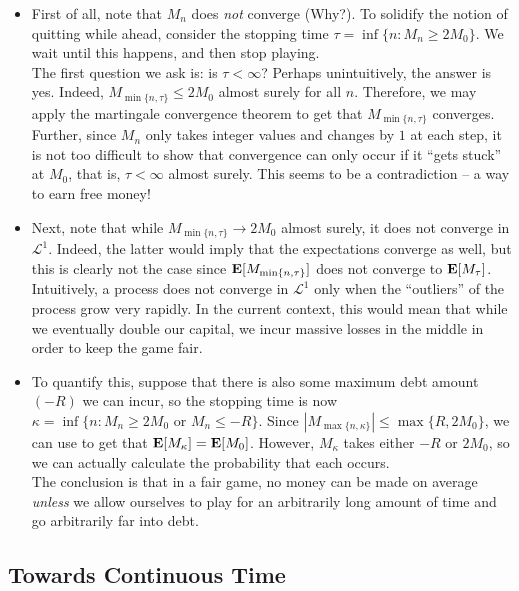 \begin{itemize}
	\item First of all, note that $M_n$ does \textit{not} converge (Why?). To solidify the notion of quitting while ahead, consider the stopping time $\tau = \inf\{n : M_n\geq 2M_0\}$. We wait until this happens, and then stop playing.\\
	The first question we ask is: is $\tau<\infty$? Perhaps unintuitively, the answer is yes. Indeed, $M_{\min\{n,\tau\}} \leq 2M_0$ almost surely for all $n$. Therefore, we may apply the martingale convergence theorem to get that $M_{\min\{n,\tau\}}$ converges. Further, since $M_n$ only takes integer values and changes by $1$ at each step, it is not too difficult to show that convergence can only occur if it ``gets stuck'' at $M_0$, that is, $\tau<\infty$ almost surely. This seems to be a contradiction --  a way to earn free money!

	\item Next, note that while $M_{\min\{n,\tau\}}\to 2M_0$ almost surely, it does not converge in $\mathcal{L}^1$. Indeed, the latter would imply that the expectations converge as well, but this is clearly not the case since $\textbf{E}[M_{\min\{n,\tau\}}]$ does not converge to $\textbf{E}[M_\tau]$. Intuitively, a process does not converge in $\mathcal{L}^1$ only when the ``outliers'' of the process grow very rapidly. In the current context, this would mean that while we eventually double our capital, we incur massive losses in the middle in order to keep the game fair.

	\item To quantify this, suppose that there is also some maximum debt amount $(-R)$ we can incur, so the stopping time is now $\kappa = \inf\{n : M_n\geq 2M_0 \text{ or }M_n\leq -R\}$. Since $|M_{\max\{n,\kappa\}}| \leq \max\{R,2M_0\}$, we can use  to get that $\textbf{E}[M_\kappa] = \textbf{E}[M_0]$. However, $M_\kappa$ takes either $-R$ or $2M_0$, so we can actually calculate the probability that each occurs.\\
	The conclusion is that in a fair game, no money can be made on average \textit{unless} we allow ourselves to play for an arbitrarily long amount of time and go arbitrarily far into debt.
\end{itemize}

\subsection{Towards Continuous Time}

